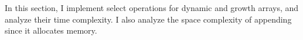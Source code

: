 In this section, I implement select operations for dynamic and growth arrays, and analyze their time complexity. I also analyze the space complexity of appending since it allocates memory.